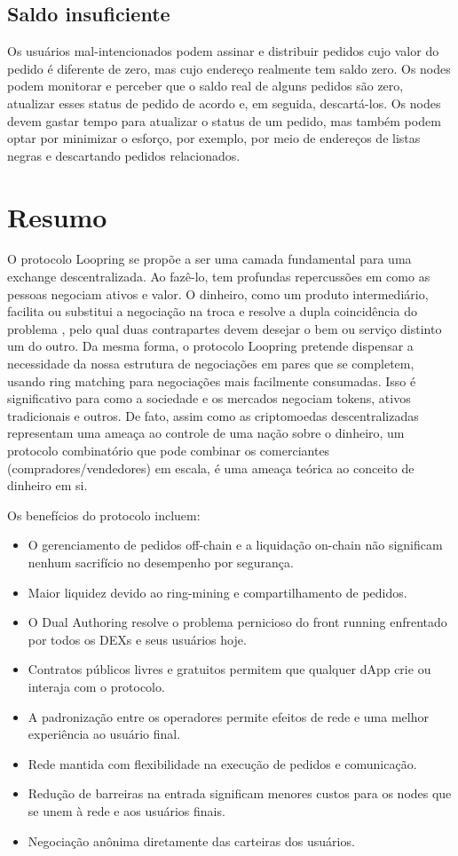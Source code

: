 \documentclass[UTF8,nofonts]{article}
\begin{document}
\begin{multicols}{2}
\subsection{Saldo insuficiente}
Os usuários mal-intencionados podem assinar e distribuir pedidos cujo valor do pedido é diferente de zero, mas cujo endereço realmente tem saldo zero. Os nodes podem monitorar e perceber que o saldo real de alguns pedidos são zero, atualizar esses status de pedido de acordo e, em seguida, descartá-los.
Os nodes devem gastar tempo para atualizar o status de um pedido, mas também podem optar por minimizar o esforço, por exemplo, por meio de endereços de listas negras e descartando pedidos relacionados.

\section{Resumo}

O protocolo Loopring se propõe a ser uma camada fundamental para uma exchange descentralizada. Ao fazê-lo, tem profundas repercussões em como as pessoas negociam ativos e valor. O dinheiro, como um produto intermediário, facilita ou substitui a negociação na troca e resolve a dupla coincidência do problema \cite{unenumerated2006}, pelo qual duas contrapartes devem desejar o bem ou serviço distinto um do outro. Da mesma forma, o protocolo Loopring pretende dispensar a necessidade da nossa estrutura de negociações em pares que se completem, usando ring matching para negociações mais facilmente consumadas. Isso é significativo para como a sociedade e os mercados negociam tokens, ativos tradicionais e outros. De fato, assim como as criptomoedas descentralizadas representam uma ameaça ao controle de uma nação sobre o dinheiro, um protocolo combinatório que pode combinar os comerciantes (compradores/vendedores) em escala, é uma ameaça teórica ao conceito de dinheiro em si.

Os benefícios do protocolo incluem:

\begin{itemize}
	\item O gerenciamento de pedidos off-chain e a liquidação on-chain não significam nenhum sacrifício no desempenho por segurança.
	\item Maior liquidez devido ao ring-mining e compartilhamento de pedidos.
	\item O Dual Authoring resolve o problema pernicioso do front running enfrentado por todos os DEXs e seus usuários hoje.
	\item Contratos públicos livres e gratuitos permitem que qualquer dApp crie ou interaja com o protocolo.
	\item A padronização entre os operadores permite efeitos de rede e uma melhor experiência ao usuário final.
	\item Rede mantida com flexibilidade na execução de pedidos e comunicação.
	\item Redução de barreiras na entrada significam menores custos para os nodes que se unem à rede e aos usuários finais.
	\item Negociação anônima diretamente das carteiras dos usuários.
\end{itemize}


\end{multicols}
\end{document}
